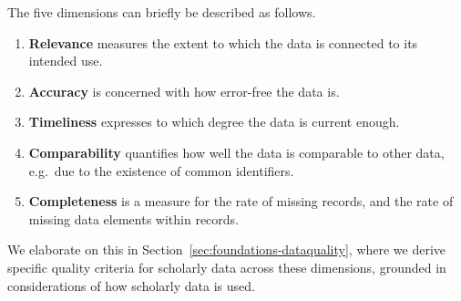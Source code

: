The five dimensions can briefly be described as follows.

\begin{enumerate}
    \item \textbf{Relevance} measures the extent to which the data is connected to its intended use.
    \item \textbf{Accuracy} is concerned with how error-free the data is.
    \item \textbf{Timeliness} expresses to which degree the data is current enough.
    \item \textbf{Comparability} quantifies how well the data is comparable to other data, e.g.\ due to the existence of common identifiers.
    \item \textbf{Completeness} is a measure for the rate of missing records, and the rate of missing data elements within records.
\end{enumerate}

We elaborate on this in Section~\ref{sec:foundations-dataquality}, where we derive specific quality criteria for scholarly data across these dimensions, grounded in considerations of how scholarly data is used.


